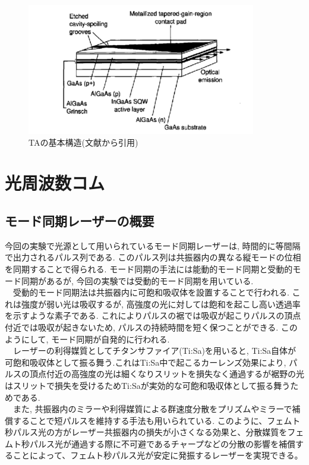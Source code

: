 \documentclass[uplatex, dvipdfmx, a4paper, report, papersize, 11pt]{jsbook}
\begin{document}
\begin{figure}[htbp]
 \begin{center}
  \includegraphics[width=100mm]{figures/chapter2/TA_structure.png}
 \end{center}
 \caption{TAの基本構造(文献\cite{Walpole1996}から引用)}
 \label{TA_structure}
\end{figure}


\section{光周波数コム}
\subsection{モード同期レーザーの概要}
今回の実験で光源として用いられているモード同期レーザーは, 時間的に等間隔で出力されるパルス列である. このパルス列は共振器内の異なる縦モードの位相を同期することで得られる. モード同期の手法には能動的モード同期と受動的モード同期があるが, 今回の実験では受動的モード同期を用いている.\\
　受動的モード同期法は共振器内に可飽和吸収体を設置することで行われる. これは強度が弱い光は吸収するが, 高強度の光に対しては飽和を起こし高い透過率を示すような素子である. これによりパルスの裾では吸収が起こりパルスの頂点付近では吸収が起きないため, パルスの持続時間を短く保つことができる. このようにして, モード同期が自発的に行われる.\\
　レーザーの利得媒質としてチタンサファイア(Ti:Sa)を用いると, Ti:Sa自体が可飽和吸収体として振る舞う.これはTi:Sa中で起こるカーレンズ効果により, パルスの頂点付近の高強度の光は細くなりスリットを損失なく通過するが裾野の光はスリットで損失を受けるためTi:Saが実効的な可飽和吸収体として振る舞うためである.\\
　また, 共振器内のミラーや利得媒質による群速度分散をプリズムやミラーで補償することで短パルスを維持する手法も用いられている. このように、フェムト秒パルス光の方がレーザー共振器内の損失が小さくなる効果と、分散媒質をフェムト秒パルス光が通過する際に不可避であるチャープなどの分散の影響を補償することによって、フェムト秒パルス光が安定に発振するレーザーを実現できる。
\end{document}
